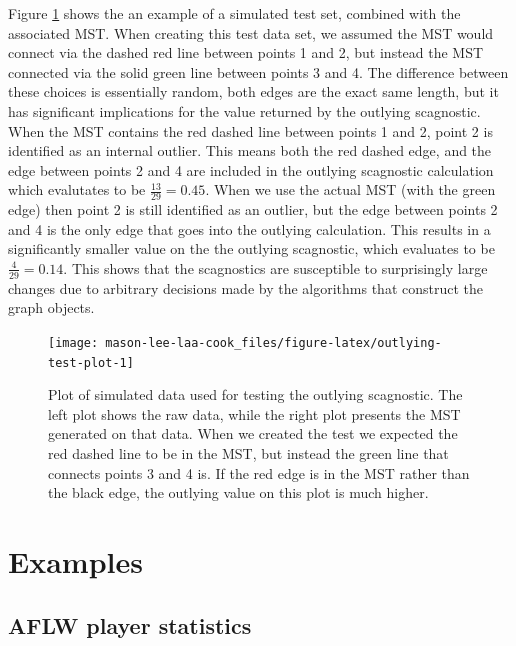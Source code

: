 Figure \ref{fig:outlying-test-plot} shows the an example of a simulated test set, combined with the associated MST. When creating this test data set, we assumed the MST would connect via the dashed red line between points 1 and 2, but instead the MST connected via the solid green line between points 3 and 4. The difference between these choices is essentially random, both edges are the exact same length, but it has significant implications for the value returned by the outlying scagnostic. When the MST contains the red dashed line between points 1 and 2, point 2 is identified as an internal outlier. This means both the red dashed edge, and the edge between points 2 and 4 are included in the outlying scagnostic calculation which evalutates to be \(\frac{13}{29}=0.45\). When we use the actual MST (with the green edge) then point 2 is still identified as an outlier, but the edge between points 2 and 4 is the only edge that goes into the outlying calculation. This results in a significantly smaller value on the the outlying scagnostic, which evaluates to be \(\frac{4}{29}=0.14\). This shows that the scagnostics are susceptible to surprisingly large changes due to arbitrary decisions made by the algorithms that construct the graph objects.

\begin{figure}
\texttt{[image: mason-lee-laa-cook\_files/figure-latex/outlying-test-plot-1]} \caption{Plot of simulated data used for testing the outlying scagnostic. The left plot shows the raw data, while the right plot presents the MST generated on that data. When we created the test we expected the red dashed line to be in the MST, but instead the green line that connects points 3 and 4 is. If the red edge is in the MST rather than the black edge, the outlying value on this plot is much higher.}\label{fig:outlying-test-plot}
\end{figure}

\hypertarget{examples}{%
\section{Examples}\label{examples}}

\hypertarget{aflw-player-statistics}{%
\subsection{AFLW player statistics}\label{aflw-player-statistics}}

